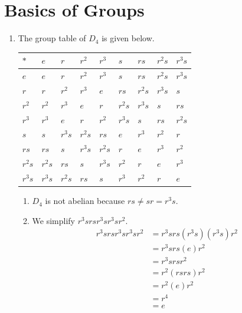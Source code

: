 \section{Basics of Groups}
\begin{enumerate}
    \item The group table of $D_4$ is given below.
    \begin{table}[h]
        \centering
        \begin{tabular}{|l|l|l|l|l|l|l|l|l|}
        \hline
        $\ast$ & $e$    & $r$    & $r^2$  & $r^3$  & $s$    & $rs$   & $r^2s$ & $r^3s$ \\ \hline
        $e$    & $e$    & $r$    & $r^2$  & $r^3$  & $s$    & $rs$   & $r^2s$ & $r^3s$ \\ \hline
        $r$    & $r$    & $r^2$  & $r^3$  & $e$    & $rs$   & $r^2s$ & $r^3s$ & $s$    \\ \hline
        $r^2$  & $r^2$  & $r^3$  & $e$    & $r$    & $r^2s$ & $r^3s$ & $s$    & $rs$   \\ \hline
        $r^3$  & $r^3$  & $e$    & $r$    & $r^2$  & $r^3s$ & $s$    & $rs$   & $r^2s$ \\ \hline
        $s$    & $s$    & $r^3s$ & $r^2s$ & $rs$   & $e$    & $r^3$  & $r^2$  & $r$    \\ \hline
        $rs$   & $rs$   & $s$    & $r^3s$ & $r^2s$ & $r$    & $e$    & $r^3$  & $r^2$  \\ \hline
        $r^2s$ & $r^2s$ & $rs$   & $s$    & $r^3s$ & $r^2$  & $r$    & $e$    & $r^3$  \\ \hline
        $r^3s$ & $r^3s$ & $r^2s$ & $rs$   & $s$    & $r^3$  & $r^2$  & $r$    & $e$    \\ \hline
        \end{tabular}
    \end{table}
    \begin{enumerate}[label=(\alph*)]
        \item $D_4$ is not abelian because $rs \neq sr = r^3s$.
        \item We simplify $r^3srsr^3sr^3sr^2$.
        \begin{align*}
            r^3srsr^3sr^3sr^2 &= r^3srs(r^3s)(r^3s)r^2\\
            &= r^3srs(e)r^2\\
            &= r^3srsr^2\\
            &= r^2(rsrs)r^2\\
            &= r^2(e)r^2\\
            &= r^4\\
            &= e
        \end{align*}
    \end{enumerate}


\end{enumerate}

